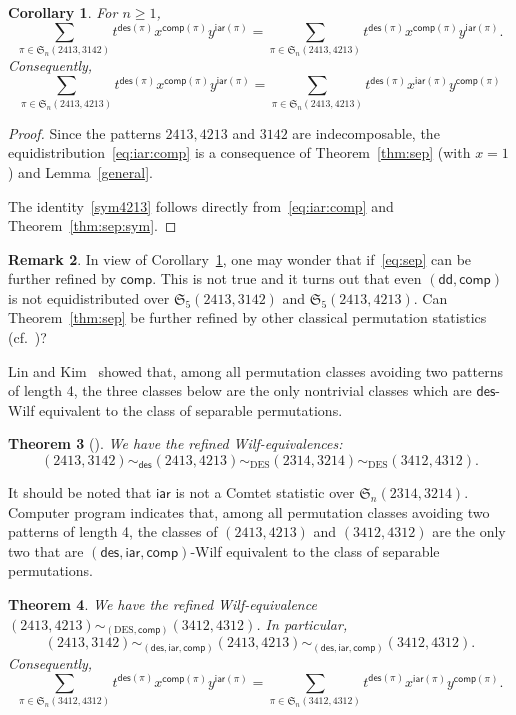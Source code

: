 \documentclass[12pt]{amsart}
\numberwithin{equation}{section}
\theoremstyle{plain}
\newtheorem{theorem}{Theorem}[section]
\newtheorem{corollary}[theorem]{Corollary}
\theoremstyle{definition}
\newtheorem{remark}[theorem]{Remark}
\def\des{\mathsf{des}}
\def\S{\mathfrak{S}}
\def\iar{\mathsf{iar}}
\def\comp{\mathsf{comp}}
\def\DES{\mathrm{DES}}
\def\dd{\mathsf{dd}}
\begin{document}
\begin{corollary} 
\label{comp:iar}
For $n\geq1$,
\begin{equation}\label{eq:iar:comp}
\sum_{\pi\in\S_n(2413,3142)}t^{\des(\pi)}x^{\comp(\pi)}y^{\iar(\pi)}=\sum_{\pi\in\S_n(2413,4213)}t^{\des(\pi)}x^{\comp(\pi)}y^{\iar(\pi)}.
\end{equation} 
Consequently, 
\begin{equation}\label{sym4213}
\sum_{\pi\in\S_n(2413,4213)}t^{\des(\pi)}x^{\comp(\pi)}y^{\iar(\pi)}=\sum_{\pi\in\S_n(2413,4213)}t^{\des(\pi)}x^{\iar(\pi)}y^{\comp(\pi)}
\end{equation}
\end{corollary}
\begin{proof}
Since the patterns $2413,4213$ and $3142$ are indecomposable, the equidistribution~\eqref{eq:iar:comp} is a consequence of Theorem~\ref{thm:sep} (with $x=1$) and Lemma~\ref{general}.

The identity~\eqref{sym4213} follows directly from~\eqref{eq:iar:comp} and Theorem~\ref{thm:sep:sym}.
\end{proof}


\begin{remark}
In view of Corollary~\ref{comp:iar}, one may wonder that if~\eqref{eq:sep} can be further refined by $\comp$. This is not true and  it turns out that even $(\dd,\comp)$ is not equidistributed over $\S_5(2413,3142)$ and $\S_5(2413,4213)$. Can Theorem~\ref{thm:sep} be further refined by other classical  permutation statistics (cf.~\cite{kit})?
\end{remark}

Lin and Kim~\cite{LK} showed that, among all permutation classes avoiding two patterns of length 4, the three classes below  are the only nontrivial classes which are $\des$-Wilf equivalent to the class of separable permutations.

\begin{theorem}[]\label{thm:kim}
We have the refined Wilf-equivalences:
$$
(2413,3142)\sim_{\des}(2413,4213)\sim_{\DES}(2314,3214)\sim_{\DES}(3412,4312).
$$
\end{theorem}

It should be noted that $\iar$ is not a Comtet statistic over $\S_n(2314,3214)$. Computer program indicates that, among all permutation classes avoiding two patterns of length 4,  the classes of $(2413,4213)$ and $(3412,4312)$ are the only two that are $(\des,\iar,\comp)$-Wilf equivalent to the class of separable permutations.
\begin{theorem}\label{thm:3412-4312}
We have the refined Wilf-equivalence $(2413,4213)\sim_{(\DES,\comp)}(3412,4312)$. In particular, 
$$(2413,3142)\sim_{(\des,\iar,\comp)}(2413,4213)\sim_{(\des,\iar,\comp)}(3412,4312).$$ Consequently, 
\begin{equation}\label{sym3412}
\sum_{\pi\in\S_n(3412,4312)}t^{\des(\pi)}x^{\comp(\pi)}y^{\iar(\pi)}=\sum_{\pi\in\S_n(3412,4312)}t^{\des(\pi)}x^{\iar(\pi)}y^{\comp(\pi)}.
\end{equation}
\end{theorem}
\end{document}
